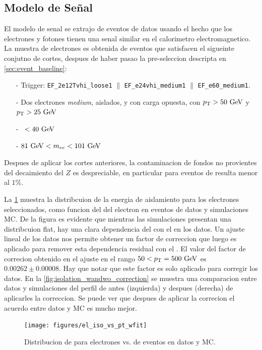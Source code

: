 \subsection{Modelo de Señal} \label{sec:jfake_sig_template}

El modelo de senal se extrajo de eventos de datos {\Zee} usando el hecho que los
electrones y fotones tienen una senal similar en el calorimetro electromagnetico.
La muestra de electrones es obtenida de eventos que satisfacen el sigueinte conjutno
de cortes, despues de haber pasao la pre-seleccion descripta en \cref{sec:event_baseline}:

\begin{itemize}\itemsep0.1cm
\item[-] Trigger: \texttt{EF\_2e12Tvhi\_loose1} $\parallel$ \texttt{EF\_e24vhi\_medium1} $\parallel$ \texttt{EF\_e60\_medium1}.
\item[-] Dos electrones \emph{medium}, aislados, y con carga opuesta, con $\pt>50 \gev$ y $\pt>25 \gev$
\item[-] \MET\ $<40\gev$
\item[-] $81\gev<m_{ee}<101\gev$
\end{itemize}

Despues de aplicar los cortes anteriores, la contaminacion de fondos no provientes
del decaimiento del $Z$ es despreciable, en particular para eventos de {\ttbar}
resulta menor al $1\%$.

La {\fig} \ref{fig:isolation_vs_pt} muestra la distribcuion de la energia de aislamiento
para los electrones seleccionados, como funcion del {\pt} del electron en eventos de datos y
simulaciones MC.
De la figura es evidente que mientras las simulaciones presentan una distribcuion flat, hay
una clara dependencia del {\etiso} con el {\pt} en los datos.
Un ajuste lineal de los datos nos permite obtener un factor de correccion que luego es
aplicado para remover esta dependencia residual con el \pt. El valor del factor de
correcion obtenido en el ajuste en el rango $50<\pt=500 \gev$ es  $0.00262 \pm 0.00008$.
Hay que notar que este factor es solo aplicado para corregir los datos.
En la \cref{fig:isolation_wandwo_correction} se muestra una comparacion entre
datos y simulaciones del perfil de {\etiso} antes (izquierda) y despues (derecha) de aplicarles
la correccion. Se puede ver que despues de aplicar la correcion el acuerdo entre datos y MC
es mucho mejor.

\begin{figure}[h]
  \centering
  \texttt{[image: figures/el\_iso\_vs\_pt\_wfit]}
  \caption{Distribucion de {\etiso} para electrones vs. {\pt} de eventos {\Zee} en datos y MC.}
  \label{fig:isolation_vs_pt}
\end{figure}

